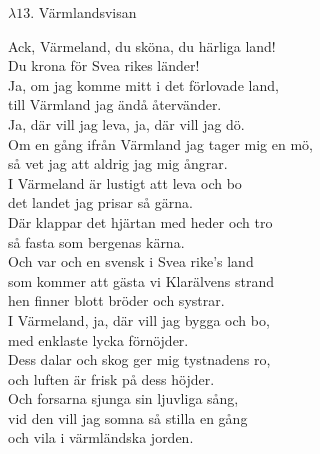 \documentclass[a6paper,10pt]{article}
\begin{document}
\setlength{\oddsidemargin}{-0.47in}
\noindent
\begin{center}
\Large $\lambda13$. Värmlandsvisan \\
\end{center}
Ack, Värmeland, du sköna, du härliga land!  \\
Du krona för Svea rikes länder!  \\
Ja, om jag komme mitt i det förlovade land,  \\
till Värmland jag ändå återvänder.  \\
Ja, där vill jag leva, ja, där vill jag dö.  \\
Om en gång ifrån Värmland jag tager mig en mö,  \\
så vet jag att aldrig jag mig ångrar. 
\vspace{5pt}\\
I Värmeland är lustigt att leva och bo\\
det landet jag prisar så gärna.\\
Där klappar det hjärtan med heder och tro\\
så fasta som bergenas kärna.\\
Och var och en svensk i Svea rike's land\\
som kommer att gästa vi Klarälvens strand\\
hen finner blott bröder och systrar.
\vspace{5pt}\\
I Värmeland, ja, där vill jag bygga och bo,\\
med enklaste lycka förnöjder.\\
Dess dalar och skog ger mig tystnadens ro,\\
och luften är frisk på dess höjder.\\
Och forsarna sjunga sin ljuvliga sång,\\
vid den vill jag somna så stilla en gång\\
och vila i värmländska jorden.
\end{document}
